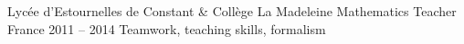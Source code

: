 \begin{cventries}
	\cventryskill
	{Lycée d'Estournelles de Constant \& Coll\`{e}ge La Madeleine} %
	{Mathematics Teacher} %
	{France} %
	{2011 -- 2014} %
	{Teamwork, teaching skills, formalism}



\end{cventries}
